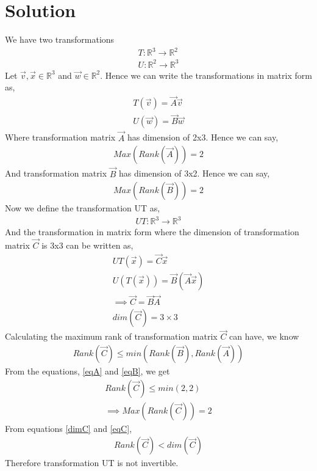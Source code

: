 \documentclass[journal,12pt,twocolumn]{IEEEtran}
\begin{document}
\section{Solution}
We have two transformations 
\begin{align}
T:\mathbb{R}^3\rightarrow\mathbb{R}^2\\
U:\mathbb{R}^2\rightarrow\mathbb{R}^3
\end{align}
Let $\vec{v},\vec{x}\in\mathbb{R}^3$ and $\vec{w}\in\mathbb{R}^2$. Hence we can write the transformations in matrix form as,
\begin{align}
T(\vec{v})=\vec{A}\vec{v} \label{Tmat}\\
U(\vec{w})=\vec{B}\vec{w} \label{Umat}
\end{align}
Where transformation matrix $\vec{A}$ has dimension of 2x3. Hence we can say,
\begin{align}\label{eqA}
Max(Rank(\vec{A}))=2
\end{align}
And transformation matrix $\vec{B}$ has dimension of 3x2. Hence we can say,
\begin{align}\label{eqB}
Max(Rank(\vec{B}))=2
\end{align}
Now we define the transformation UT as,
\begin{align}
UT:\mathbb{R}^3\rightarrow\mathbb{R}^3
\end{align}
And the transformation in matrix form where the dimension of transformation matrix $\vec{C}$ is 3x3 can be written as,
\begin{align}
UT(\vec{x})=\vec{C}\vec{x}\\
U(T(\vec{x}))=\vec{B}(\vec{A}\vec{x})\\
\implies \vec{C}=\vec{B}\vec{A} \label{MatC}\\
dim(\vec{C})=3\times3 \label{dimC}
\end{align}
Calculating the maximum rank of transformation matrix $\vec{C}$ can have, we know
\begin{align}
Rank(\vec{C})\le min(Rank(\vec{B}),Rank(\vec{A}))
\end{align}
From the equations, \eqref{eqA} and \eqref{eqB}, we get
\begin{align}
Rank(\vec{C})\le min(2,2)\\
\implies Max(Rank(\vec{C}))=2 \label{eqC}
\end{align}
From equations \eqref{dimC} and \eqref{eqC},
\begin{align}
Rank(\vec{C})< dim(\vec{C})
\end{align}
Therefore transformation UT is not invertible.
\end{document}
